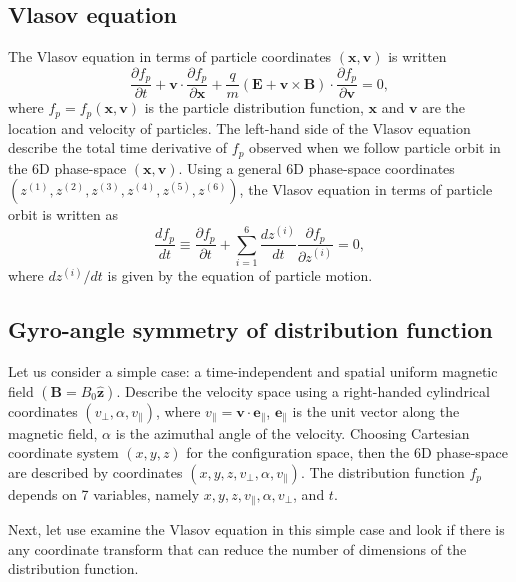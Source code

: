 \documentclass{llncs}
\begin{document}
\subsection{Vlasov equation}

The Vlasov equation in terms of particle coordinates $(\mathbf{x},
\mathbf{v})$ is written
\begin{equation}
  \frac{\partial f_p}{\partial t} +\mathbf{v} \cdot \frac{\partial
  f_p}{\partial \mathbf{x}} + \frac{q}{m} (\mathbf{E}+\mathbf{v} \times
  \mathbf{B}) \cdot \frac{\partial f_p}{\partial \mathbf{v}} = 0,
\end{equation}
where $f_p = f_p (\mathbf{x}, \mathbf{v})$ is the particle distribution
function, $\mathbf{x}$ and $\mathbf{v}$ are the location and velocity of
particles. The left-hand side of the Vlasov equation describe the total time
derivative of $f_p$ observed when we follow particle orbit in the 6D
phase-space $(\mathbf{x}, \mathbf{v})$. Using a general 6D phase-space
coordinates $(z^{(1)}, z^{(2)}, z^{(3)}, z^{(4)}, z^{(5)}, z^{(6)})$, the
Vlasov equation in terms of particle orbit is written as
\begin{equation}
  \label{19-1-31-6} \frac{d f_p}{d t} \equiv \frac{\partial f_p}{\partial t} +
  \sum_{i = 1}^6 \frac{d z^{(i)}}{d t}  \frac{\partial f_p}{\partial z^{(i)}}
  = 0,
\end{equation}
where $d z^{(i)} / d t$ is given by the equation of particle motion.

\subsection{Gyro-angle symmetry of distribution function}\label{19-4-23-p1}

Let us consider a simple case: a time-independent and spatial uniform magnetic
field $(\mathbf{B}= B_0 \hat{\mathbf{z}})$. Describe the velocity space using
a right-handed cylindrical coordinates $(v_{\perp}, \alpha, v_{\parallel})$,
where $v_{\parallel} =\mathbf{v} \cdot \mathbf{e}_{\parallel}$,
$\mathbf{e}_{\parallel}$ is the unit vector along the magnetic field, $\alpha$
is the azimuthal angle of the velocity. Choosing Cartesian coordinate system
$(x, y, z)$ for the configuration space, then the 6D phase-space are described
by coordinates $(x, y, z, v_{\perp}, \alpha, v_{\parallel})$. The distribution
function $f_p$ depends on 7 variables, namely $x, y, z, v_{\parallel}, \alpha,
v_{\perp}$, and $t$.

Next, let use examine the Vlasov equation in this simple case and look if
there is any coordinate transform that can reduce the number of dimensions of
the distribution function.
\end{document}
